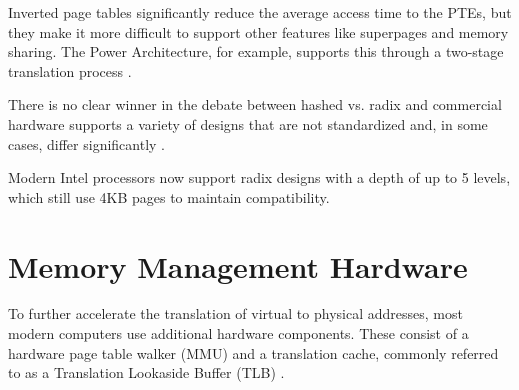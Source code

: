 Inverted page tables significantly reduce the average access time to the PTEs, but they make it
more difficult to support other features like superpages and memory sharing.
The Power Architecture, for example, supports this through a two-stage translation process \cite{yaniv2016hash}.





There is no clear winner in the debate between hashed vs. radix 
and commercial hardware supports a variety of designs that are not standardized and, in some cases,
differ significantly \cite{jacob1998look}.


Modern Intel processors now support radix designs with a depth of up to 5 levels,
which still use 4KB pages to maintain compatibility.





\cite{denning1970virtual} %
\section{Memory Management Hardware}
To further accelerate the translation of virtual to physical addresses, most modern computers use additional
hardware components. These consist of a hardware page table walker (MMU) and a translation cache,
commonly referred to as a Translation Lookaside Buffer (TLB) \cite{jacobVirtualMemoryContemporary1998}.

